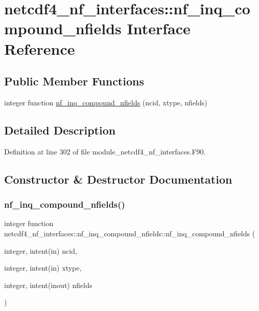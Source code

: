 \hypertarget{interfacenetcdf4__nf__interfaces_1_1nf__inq__compound__nfields}{}\section{netcdf4\+\_\+nf\+\_\+interfaces\+:\+:nf\+\_\+inq\+\_\+compound\+\_\+nfields Interface Reference}
\label{interfacenetcdf4__nf__interfaces_1_1nf__inq__compound__nfields}
\subsection*{Public Member Functions}
\begin{DoxyCompactItemize}
\item 
integer function \hyperlink{interfacenetcdf4__nf__interfaces_1_1nf__inq__compound__nfields_a109a9b1581c3b04ff7e2f05a698f5598}{nf\+\_\+inq\+\_\+compound\+\_\+nfields} (ncid, xtype, nfields)
\end{DoxyCompactItemize}


\subsection{Detailed Description}


Definition at line 302 of file module\+\_\+netcdf4\+\_\+nf\+\_\+interfaces.\+F90.



\subsection{Constructor \& Destructor Documentation}
\mbox{\label{interfacenetcdf4__nf__interfaces_1_1nf__inq__compound__nfields_a109a9b1581c3b04ff7e2f05a698f5598}} 
\subsubsection{\texorpdfstring{nf\+\_\+inq\+\_\+compound\+\_\+nfields()}{nf\_inq\_compound\_nfields()}}
{\footnotesize\ttfamily integer function netcdf4\+\_\+nf\+\_\+interfaces\+::nf\+\_\+inq\+\_\+compound\+\_\+nfields\+::nf\+\_\+inq\+\_\+compound\+\_\+nfields (\begin{DoxyParamCaption}\item[{integer, intent(in)}]{ncid,  }\item[{integer, intent(in)}]{xtype,  }\item[{integer, intent(inout)}]{nfields }\end{DoxyParamCaption})}



